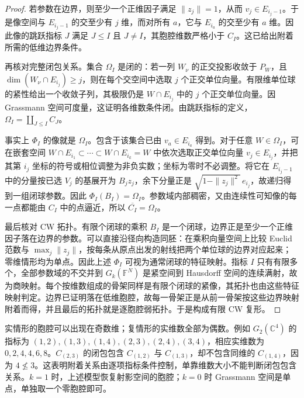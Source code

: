 \begin{proof}
	若参数在边界，则至少一个正维因子满足 \(\|z_j\|=1\)，从而 \(v_j\in E_{i_j-1}\)。于是像空间与 \(E_{i_j-1}\) 的交至少有 \(j\) 维，而对所有 \(a\)，它与 \(E_{i_a}\) 的交至少有 \(a\) 维。因此像的跳跃指标 \(J\) 满足 \(J\leq I\) 且 \(J\ne I\)，其胞腔维数严格小于 \(C_I\)。这已给出附着所需的低维边界条件。

	再核对完整闭包关系。集合 \(\Omega_I\) 是闭的：若一列 \(W_\nu\) 的正交投影收敛于 \(P_W\)，且 \(\dim(W_\nu\cap E_{i_j})\geq j\)，则在每个交空间中选取 \(j\) 个正交单位向量。有限维单位球的紧性给出一个收敛子列，其极限仍是 \(W\cap E_{i_j}\) 中的 \(j\) 个正交单位向量。因 Grassmann 空间可度量，这证明各维数条件闭。由跳跃指标的定义，\(\Omega_I=\coprod_{J\leq I}C_J\)。

	事实上 \(\Phi_I\) 的像就是 \(\Omega_I\)。包含于该集合已由 \(v_a\in E_{i_a}\) 得到。对于任意 \(W\in\Omega_I\)，可在嵌套空间 \(W\cap E_{i_1}\subset\cdots\subset W\cap E_{i_k}=W\) 中依次选取正交单位向量 \(v_j\in E_{i_j}\)，并把其第 \(i_j\) 坐标的符号或相位调整为非负实数；坐标为零时不必调整。将它在 \(E_{i_j-1}\) 中的分量按已选 \(V_j\) 的基展开为 \(B_jz_j\)，余下分量正是 \(\sqrt{1-\|z_j\|^2}\,e_{i_j}\)，故递归得到一组闭球参数。因此 \(\Phi_I(B_I)=\Omega_I\)。参数域内部稠密，又由连续性可知像的每一点都能由 \(C_I\) 中的点逼近，所以 \(\overline{C_I}=\Omega_I\)。

	最后核对 CW 拓扑。有限个闭球的乘积 \(B_I\) 是一个闭球，边界正是至少一个正维因子落在边界的参数。可以直接沿径向构造同胚：在乘积向量空间上比较 Euclid 范数与 \(\max_j\|z_j\|\)，按每条从原点出发的射线把两个单位球的边界对应起来；零维情形均为单点。因此上述 \(\Phi_I\) 可视为通常闭球的特征映射。指标 \(I\) 只有有限多个，全部参数域的不交并到 \(G_k(\mathbb F^N)\) 是紧空间到 Hausdorff 空间的连续满射，故为商映射。每个按维数组成的骨架同样是有限个闭球的紧像，其拓扑也由这些特征映射判定。边界已证明落在低维胞腔，故每一骨架正是从前一骨架按这些边界映射附着而得，并且最后的拓扑就是逐胞腔弱拓扑。于是构成有限 CW 复形。
\end{proof}

实情形的胞腔可以出现在奇数维；复情形的实维数全部为偶数。例如 \(G_2(\mathbb C^4)\) 的指标为 \((1,2),(1,3),(1,4),(2,3),(2,4),(3,4)\)，相应实维数为 \(0,2,4,4,6,8\)。\(C_{(2,3)}\) 的闭包包含 \(C_{(1,2)}\) 与 \(C_{(1,3)}\)，却不包含同维的 \(C_{(1,4)}\)，因为 \(4\nleq3\)。这表明附着关系由逐项指标条件控制，单靠维数大小不能判断闭包包含关系。\(k=1\) 时，上述模型恢复射影空间的胞腔；\(k=0\) 时 Grassmann 空间是单点，单独取一个零胞腔即可。
